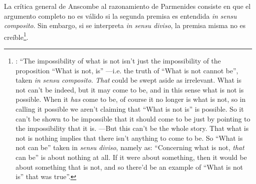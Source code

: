La crítica general de Anscombe al razonamiento de Parmenides consiste en que el argumento completo no es válido si la segunda premisa es entendida \emph{in sensu composito}. Sin embargo, si se interpreta \emph{in sensu diviso}, la premisa misma no es creíble\footnote{\Cite[vii]{anscombe1981parmenides}: \enquote{The impossibility of what is not isn't just the impossibility of the proposition ``What is not, is'' ---i.e. the truth of ``What is not cannot be'', taken \emph{in sensu composito}. \emph{That} could be swept aside as irrelevant. What is not can't be indeed, but it may come to be, and in this sense what is not is possible. When it \emph{has} come to be, of course it no longer is what is not, so in calling it possible we aren't claiming that ``What is not is'' is possible. So it can't be shown to be impossible that it should come to be just by pointing to the impossibility that it is. ---But this can't be the whole story. That what is not is nothing implies that there isn't anything to come to be. So ``What is not can be'' taken in \emph{sensu diviso}, namely as: ``Concerning what is not, \emph{that} can be'' is about nothing at all. If it were about something, then it would be about something that is not, and so there'd be an example of ``What is not is'' that was true}.}.
